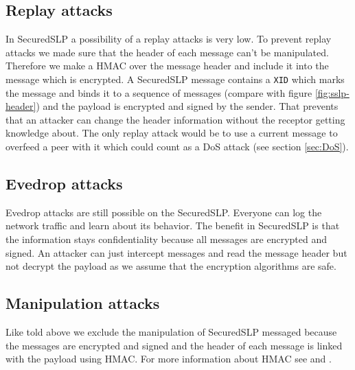 \subsection{Replay attacks}
In SecuredSLP a possibility of a replay attacks is very low. To prevent replay attacks we made sure that the header of each message can't be manipulated. Therefore we make a HMAC over the message header and include it into the message which is encrypted.  A SecuredSLP message contains a \texttt{XID} which marks the message and binds it to a sequence of messages (compare with figure \ref{fig:sslp-header}) and the payload is encrypted and signed by the sender. That prevents that an attacker can change the header information without the receptor getting knowledge about. The only replay attack would be to use a current message to overfeed a peer with it which could count as a DoS attack (see section \ref{sec:DoS}).

\subsection{Evedrop attacks}
Evedrop attacks are still possible on the SecuredSLP. Everyone can log the network traffic and learn about its behavior. The benefit in SecuredSLP is that the information stays confidentiality because all messages are encrypted and signed. An attacker can just intercept messages and read the message header but not decrypt the payload as we assume that the encryption algorithms are safe.

\subsection{Manipulation attacks}
Like told above we exclude the manipulation of SecuredSLP messaged because the messages are encrypted and signed and the header of each message is linked with the payload using HMAC. For more information about HMAC see \cite{Kraw97} and \cite{Kero00}.